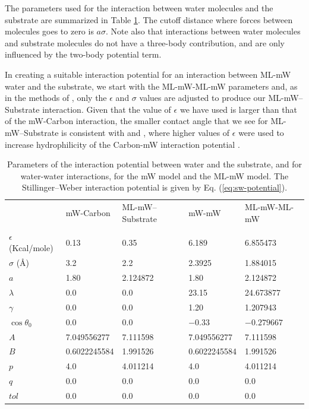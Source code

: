 \documentclass[journal abbreviation, manuscript]{copernicus}
\begin{document}
The parameters used for the interaction between water molecules and the substrate are summarized in Table \ref{Tab:potentials}. The cutoff distance where forces between molecules goes to zero is $a\sigma$. Note also that interactions between water molecules and substrate molecules do not have a three-body contribution, and are only influenced by the two-body potential term.

In creating a suitable interaction potential for an interaction between ML-mW water and the substrate, we start with the ML-mW-ML-mW parameters and, as in the methods of \citet{fitzner2015facets}, only the $\epsilon$ and $\sigma$ values are adjusted to produce our ML-mW--Substrate interaction. Given that the value of $\epsilon$ we have used is larger than that of the mW-Carbon interaction, the smaller contact angle that we see for ML-mW--Substrate is consistent with \citet{Bi2016} and \citet{cox2015hydrophilicity}, where higher values of $\epsilon$ were used to increase hydrophilicity of the Carbon-mW interaction potential \cite{Bi2016}.

\appendixtables
\begin{table}
\caption{Parameters of the interaction potential between water and the substrate, and for water-water interactions, for the mW model and the ML-mW model. The Stillinger--Weber interaction potential is given by Eq. (\ref{eq:sw-potential}). \label{Tab:potentials}}
\begin{tabular}{ |p{1.95cm}||p{3.0cm}|p{3.0cm}|p{3.0cm}|p{3.0cm}|  }
 \hline
 & mW-Carbon  & ML-mW--Substrate & mW-mW  &  ML-mW-ML-mW \\
& \citep{lupi2014}  & & \citep{molinero2009} &  \citep{chan2019} \\
 \hline
 $\epsilon$ (Kcal/mole)    & 0.13          & 0.35      & 6.189         & 6.855473  \\
 $\sigma$ (\AA{})      & 3.2           & 2.2       & 2.3925        & 1.884015\\
 $a$                      & 1.80          & 2.124872  & 1.80          & 2.124872  \\
 $\lambda$                 & 0.0           & 0.0       & 23.15         & 24.673877 \\
 $\gamma$                  & 0.0           & 0.0       & 1.20          & 1.207943  \\
 $\cos\theta_0$              & 0.0           & 0.0       & $-0.33$         & $-0.279667$ \\
 $A$                      & 7.049556277   & 7.111598  & 7.049556277   & 7.111598  \\
 $B$                      & 0.6022245584  & 1.991526  & 0.6022245584  & 1.991526  \\
 $p$                      & 4.0           & 4.011214  & 4.0           & 4.011214  \\
 $q$                      & 0.0           & 0.0       & 0.0           & 0.0       \\
 $tol$                    & 0.0           & 0.0       & 0.0           & 0.0       \\
 \hline
\end{tabular}
\end{table}
\end{document}
